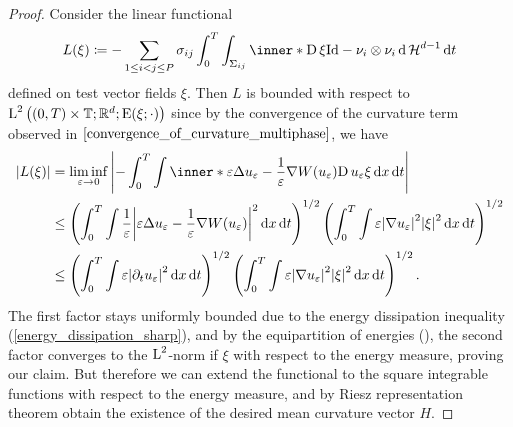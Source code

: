 \begin{proof}
	Consider the linear functional 
	\begin{equation*}
		L ( \xi )
		\coloneqq
		- \sum_{ 1 \leq i < j \leq P }
			\sigma_{ i j }
			\int_{ 0 }^{ T }
				\int_{ \Sigma_{ i j } }
					\inner*{ \diff \xi }{ \mathrm{Id} - \nu_{ i } \otimes \nu_{ 
					i } }
				\dd{ \hm^{ d - 1 } }
			\dd{ t }
	\end{equation*}
	defined on test vector fields $ \xi $. Then $ L $ is bounded with respect 
	to $ \operatorname{L}^{ 2 } \left( ( 0 , T ) \times \operatorname{\mathbb{T}} ; \mathbb{ R }^{ d } ; 
	\operatorname{E} ( \xi ; \cdot ) \right) $ since by the convergence of the curvature 
	term observed in $ \Cref{convergence_of_curvature_multiphase} $, we have
	\begin{align*}
		\abs{ L ( \xi ) }
		& =
		\liminf_{ \varepsilon \to 0 }
			\abs{ 
				-
				\int_{ 0 }^{ T }
					\int
						\inner*{
							\varepsilon \Delta u_{ \varepsilon } 
							-
							\frac{ 1 }{ \varepsilon }
							\nabla W ( u_{ \varepsilon } )
						}
						{ \diff u_{ \varepsilon } \xi }
					\dd{ x }
				\dd{ t }
			}
		\\
		& \leq
		\left(
			\int_{ 0 }^{ T }
				\int
					\frac{ 1 }{ \varepsilon }
					\abs{ 
						\varepsilon \Delta u_{ \varepsilon }
						-
						\frac{ 1 }{ \varepsilon }
						\nabla W ( u_{ \varepsilon } )
					}^{ 2 }
				\dd{ x }
			\dd{ t }
		\right)^{ 1/2 }
		\left(
			\int_{ 0 }^{ T }
				\int
					\varepsilon
					\abs{ \nabla u_{ \varepsilon } }^{ 2 }
					\abs{ \xi }^{ 2 }
				\dd{ x }
			\dd{ t }
		\right)^{ 1/2 }
		\\
		& \leq
				\left(
		\int_{ 0 }^{ T }
		\int
		 \varepsilon
		\abs{ 
		\partial_{ t } u_{ \varepsilon }
		}^{ 2 }
		\dd{ x }
		\dd{ t }
		\right)^{ 1/2 }
		\left(
		\int_{ 0 }^{ T }
		\int
		\varepsilon
		\abs{ \nabla u_{ \varepsilon } }^{ 2 }
		\abs{ \xi }^{ 2 }
		\dd{ x }
		\dd{ t }
		\right)^{ 1/2 }.
	\end{align*}
	The first factor stays uniformly bounded due to the energy dissipation 
	inequality (\ref{energy_dissipation_sharp}), and by the equipartition of 
	energies (), the second factor 
	converges to the $ \operatorname{L}^{ 2 } $-norm if $ \xi $ with respect to the energy 
	measure, proving our claim. But therefore we can extend the functional to 
	the square integrable functions with respect to the energy measure, and by 
	Riesz representation theorem obtain the existence of the desired mean 
	curvature vector $ H $.
	

\end{proof}

